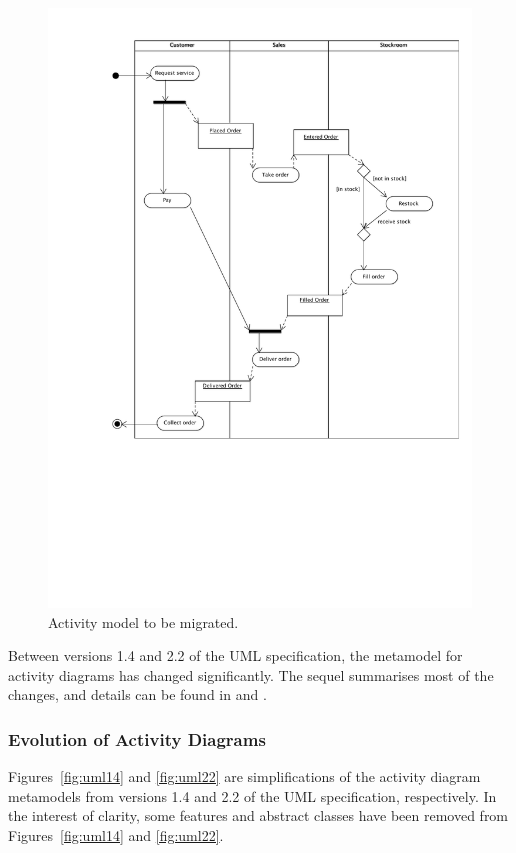 \begin{figure}[htbp]
  \centering
  \includegraphics*[viewport=75 230 585 800,width=13cm]{6.Evaluation/images/activity.pdf}
  \caption{Activity model to be migrated.}
  \label{fig:activity}
\end{figure}

Between versions 1.4 and 2.2 of the UML specification, the metamodel for activity diagrams has changed significantly. The sequel summarises most of the changes, and details can be found in \cite{uml14} and \cite{uml22}.

\subsubsection{Evolution of Activity Diagrams}
Figures~\ref{fig:uml14} and \ref{fig:uml22} are simplifications of the activity diagram metamodels from versions 1.4 and 2.2 of the UML specification, respectively. In the interest of clarity, some features and abstract classes have been removed from Figures~\ref{fig:uml14} and \ref{fig:uml22}.

